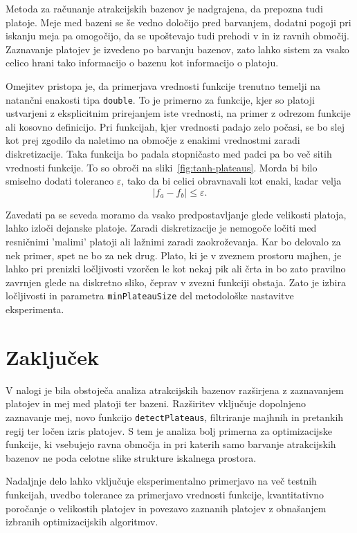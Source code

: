 \documentclass[12pt,a4paper]{article}
\begin{document}
    Metoda za računanje atrakcijskih bazenov je nadgrajena, da prepozna tudi platoje. Meje med bazeni se še vedno določijo pred barvanjem, dodatni pogoji pri iskanju meja pa omogočijo, da se upoštevajo tudi prehodi v in iz ravnih območij. Zaznavanje platojev je izvedeno po barvanju bazenov, zato lahko sistem za vsako celico hrani tako informacijo o bazenu kot informacijo o platoju.
    
    Omejitev pristopa je, da primerjava vrednosti funkcije trenutno temelji na natančni enakosti tipa \texttt{double}. To je primerno za funkcije, kjer so platoji ustvarjeni z eksplicitnim prirejanjem iste vrednosti, na primer z odrezom funkcije ali kosovno definicijo. Pri funkcijah, kjer vrednosti padajo zelo počasi, se bo slej kot prej zgodilo da naletimo na območje z enakimi vrednostmi zaradi diskretizacije. Taka funkcija bo padala stopničasto med padci pa bo več sitih vrednosti funkcije. To so obroči na sliki~\ref{fig:tanh-plateaus}. 
    Morda bi bilo smiselno dodati toleranco \(\varepsilon\), tako da bi celici obravnavali kot enaki, kadar velja
    \[
    |f_a - f_b| \le \varepsilon.
    \]
    
    Zavedati pa se seveda moramo da vsako predpostavljanje glede velikosti platoja, lahko izloči dejanske platoje. Zaradi diskretizacije je nemogoče ločiti med resničnimi 'malimi' platoji ali lažnimi zaradi zaokroževanja. Kar bo delovalo za nek primer, spet ne bo za nek drug.
    Plato, ki je v zveznem prostoru majhen, je lahko pri prenizki ločljivosti vzorčen le kot nekaj pik ali črta in bo zato pravilno zavrnjen glede na diskretno sliko, čeprav v zvezni funkciji obstaja. Zato je izbira ločljivosti in parametra \texttt{minPlateauSize} del metodološke nastavitve eksperimenta.
    
    \section{Zaključek}
    
    V nalogi je bila obstoječa analiza atrakcijskih bazenov razširjena z zaznavanjem platojev in mej med platoji ter bazeni. Razširitev vključuje dopolnjeno zaznavanje mej, novo funkcijo \texttt{detectPlateaus}, filtriranje majhnih in pretankih regij ter ločen izris platojev. S tem je analiza bolj primerna za optimizacijske funkcije, ki vsebujejo ravna območja in pri katerih samo barvanje atrakcijskih bazenov ne poda celotne slike strukture iskalnega prostora.
    
    Nadaljnje delo lahko vključuje eksperimentalno primerjavo na več testnih funkcijah, uvedbo tolerance za primerjavo vrednosti funkcije, kvantitativno poročanje o velikostih platojev in povezavo zaznanih platojev z obnašanjem izbranih optimizacijskih algoritmov.
    
\end{document}
